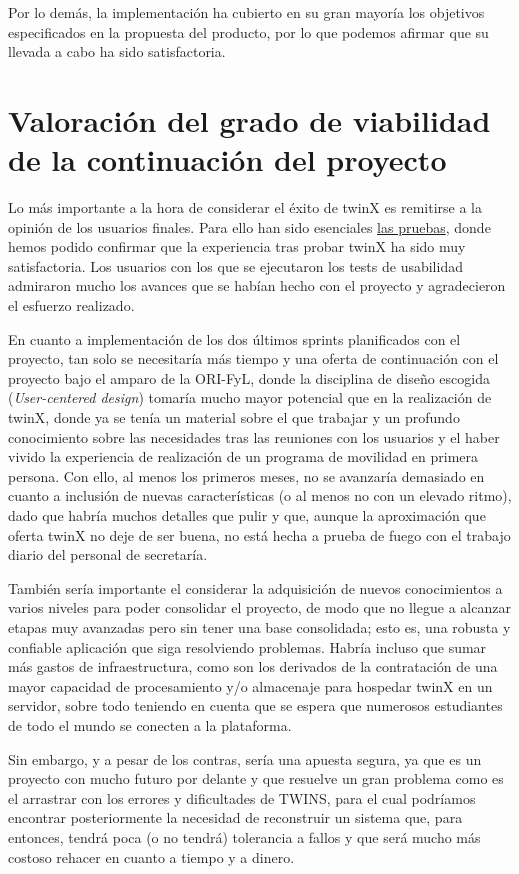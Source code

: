 Por lo demás, la implementación ha cubierto en su gran mayoría los objetivos especificados en la propuesta del producto, por lo que podemos afirmar que su llevada a cabo ha sido satisfactoria.

\section{Valoración del grado de viabilidad de la continuación del proyecto}

Lo más importante a la hora de considerar el éxito de twinX es remitirse a la opinión de los usuarios finales. Para ello han sido esenciales \hyperref[pruebas]{las pruebas}, donde hemos podido confirmar que la experiencia tras probar twinX ha sido muy satisfactoria. Los usuarios con los que se ejecutaron los tests de usabilidad admiraron mucho los avances que se habían hecho con el proyecto y agradecieron el esfuerzo realizado.

En cuanto a implementación de los dos últimos sprints planificados con el proyecto, tan solo se necesitaría más tiempo y una oferta de continuación con el proyecto bajo el amparo de la ORI-FyL, donde la disciplina de diseño escogida (\textit{User-centered design}) tomaría mucho mayor potencial que en la realización de twinX, donde ya se tenía un material sobre el que trabajar y un profundo conocimiento sobre las necesidades tras las reuniones con los usuarios y el haber vivido la experiencia de realización de un programa de movilidad en primera persona. Con ello, al menos los primeros meses, no se avanzaría demasiado en cuanto a inclusión de nuevas características (o al menos no con un elevado ritmo), dado que habría muchos detalles que pulir y que, aunque la aproximación que oferta twinX no deje de ser buena, no está hecha a prueba de fuego con el trabajo diario del personal de secretaría.

También sería importante el considerar la adquisición de nuevos conocimientos a varios niveles para poder consolidar el proyecto, de modo que no llegue a alcanzar etapas muy avanzadas pero sin tener una base consolidada; esto es, una robusta y confiable aplicación que siga resolviendo problemas. Habría incluso que sumar más gastos de infraestructura, como son los derivados de la contratación de una mayor capacidad de procesamiento y/o almacenaje para hospedar twinX en un servidor, sobre todo teniendo en cuenta que se espera que numerosos estudiantes de todo el mundo se conecten a la plataforma.

Sin embargo, y a pesar de los contras, sería una apuesta segura, ya que es un proyecto con mucho futuro por delante y que resuelve un gran problema como es el arrastrar con los errores y dificultades de TWINS, para el cual podríamos encontrar posteriormente la necesidad de reconstruir un sistema que, para entonces, tendrá poca (o no tendrá) tolerancia a fallos y que será mucho más costoso rehacer en cuanto a tiempo y a dinero.

